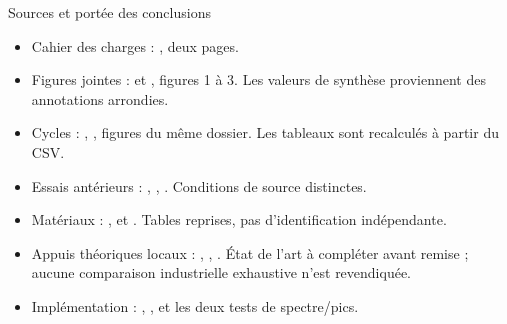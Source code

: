 \begin{frame}{Sources et portée des conclusions}
\scriptsize
\begin{itemize}
\item Cahier des charges : , deux pages.
\item Figures jointes :  et , figures 1 à 3. Les valeurs de synthèse proviennent des annotations arrondies.
\item Cycles : , , figures du même dossier. Les tableaux sont recalculés à partir du CSV.
\item Essais antérieurs : , , . Conditions de source distinctes.
\item Matériaux : ,  et . Tables reprises, pas d'identification indépendante.
\item Appuis théoriques locaux : , , . État de l'art à compléter avant remise ; aucune comparaison industrielle exhaustive n'est revendiquée.
\item Implémentation : , ,  et les deux tests de spectre/pics.
\end{itemize}
\end{frame}
